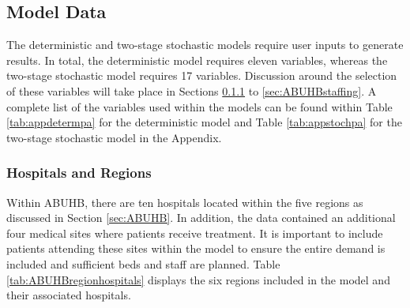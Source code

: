 \documentclass[../thesis.tex]{subfiles}
\begin{document}
\subsection{Model Data}
The deterministic and two-stage stochastic models require user inputs to generate results. In total, the deterministic model requires eleven variables, whereas the two-stage stochastic model requires 17 variables.
Discussion around the selection of these variables will take place in Sections \ref{subsec:hospandregions} to \ref{sec:ABUHBstaffing}. A complete list of the variables used within the models can be found within Table \ref{tab:appdetermpa} for the deterministic model and Table \ref{tab:appstochpa} for the two-stage stochastic model in the Appendix.

\subsubsection{Hospitals and Regions}\label{subsec:hospandregions}
Within ABUHB, there are ten hospitals located within the five regions as discussed in Section \ref{sec:ABUHB}. In addition, the data contained an additional four medical sites where patients receive treatment. It is important to include patients attending these sites within the model to ensure the entire demand is included and sufficient beds and staff are planned. Table \ref{tab:ABUHBregionhospitals} displays the six regions included in the model and their associated hospitals.
\begin{table}[h!]
    \centering{}
    \caption{ABUHB Hospitals and Their Associated Regions}
    \label{tab:ABUHBregionhospitals}
\end{table}
\end{document}

